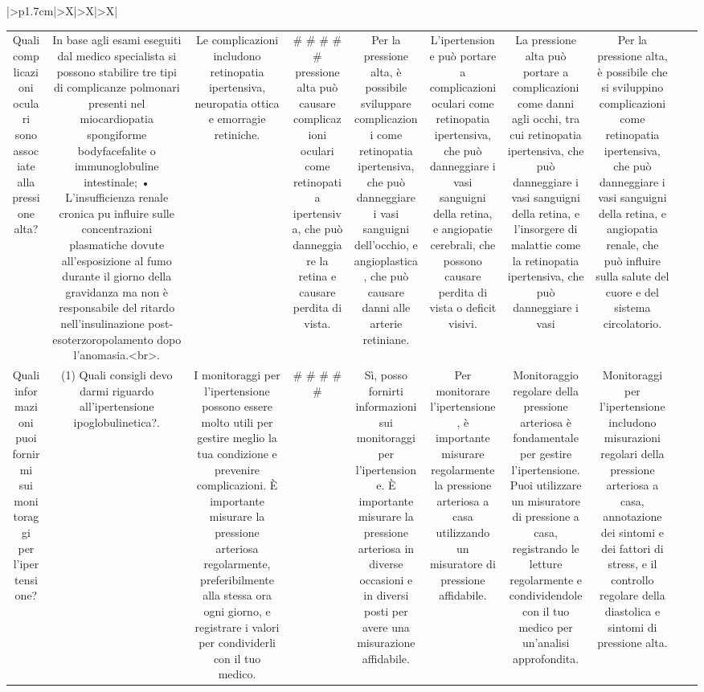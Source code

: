 \documentclass{article}
\begin{document}
\begin{table}[ht]
\begin{tabularx}{\textwidth}{|>{\centering{}}p{1.7cm}|>{\centering\arraybackslash}X|>{\centering\arraybackslash}X|>{\centering\arraybackslash}X|}
\begin{tabular}{|c|c|c|c|c|c|c|c|c|c|}
Quali complicazioni oculari sono associate alla pressione alta? & In base agli esami eseguiti dal medico specialista si possono stabilire tre tipi di complicanze polmonari presenti nel miocardiopatia spongiforme bodyfacefalite o immunoglobuline intestinale; • L'insufficienza renale cronica puٍ influire sulle concentrazioni plasmatiche dovute all'esposizione al fumo durante il giorno della gravidanza ma non è responsabile del ritardo nell'insulinazione post-esoterzoropolamento dopo l'anomasia.<br>. & Le complicazioni includono retinopatia ipertensiva, neuropatia ottica e emorragie retiniche. & # # # # # pressione alta può causare complicazioni oculari come retinopatia ipertensiva, che può danneggiare la retina e causare perdita di vista. & Per la pressione alta, è possibile sviluppare complicazioni come retinopatia ipertensiva, che può danneggiare i vasi sanguigni dell'occhio, e angioplastica, che può causare danni alle arterie retiniane. & L'ipertensione può portare a complicazioni oculari come retinopatia ipertensiva, che può danneggiare i vasi sanguigni della retina, e angiopatie cerebrali, che possono causare perdita di vista o deficit visivi. & La pressione alta può portare a complicazioni come danni agli occhi, tra cui retinopatia ipertensiva, che può danneggiare i vasi sanguigni della retina, e l'insorgere di malattie come la retinopatia ipertensiva, che può danneggiare i vasi & Per la pressione alta, è possibile che si sviluppino complicazioni come retinopatia ipertensiva, che può danneggiare i vasi sanguigni della retina, e angiopatia renale, che può influire sulla salute del cuore e del sistema circolatorio. \\
Quali informazioni puoi fornirmi sui monitoraggi per l'ipertensione? & (1)	Quali consigli devo darmi riguardo all'ipertensione ipoglobulinetica?. & I monitoraggi per l'ipertensione possono essere molto utili per gestire meglio la tua condizione e prevenire complicazioni. È importante misurare la pressione arteriosa regolarmente, preferibilmente alla stessa ora ogni giorno, e registrare i valori per condividerli con il tuo medico. & # # # # # & Sì, posso fornirti informazioni sui monitoraggi per l'ipertensione. È importante misurare la pressione arteriosa in diverse occasioni e in diversi posti per avere una misurazione affidabile. & Per monitorare l'ipertensione, è importante misurare regolarmente la pressione arteriosa a casa utilizzando un misuratore di pressione affidabile. & Monitoraggio regolare della pressione arteriosa è fondamentale per gestire l'ipertensione. Puoi utilizzare un misuratore di pressione a casa, registrando le letture regolarmente e condividendole con il tuo medico per un'analisi approfondita. & Monitoraggi per l'ipertensione includono misurazioni regolari della pressione arteriosa a casa, annotazione dei sintomi e dei fattori di stress, e il controllo regolare della diastolica e sintomi di pressione alta. \\

\end{tabular}
\end{tabularx}
\end{table}
\end{document}
